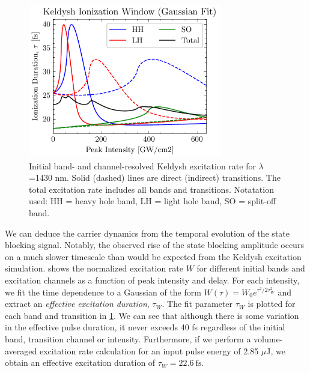 \begin{figure}
	\centering
	\includegraphics[width=0.75\textwidth]{figures/chap4/Keldysh_SingleInt_IonizationWindowFit.pdf}
	\caption{Initial band- and channel-resolved Keldysh excitation rate for $\lambda$=1430 nm. Solid (dashed) lines are direct (indirect) transitions. The total excitation rate includes all bands and transitions. Notatation used: HH = heavy hole band, LH = light hole band, SO = split-off band.}
	\label{fig:Keldysh_SingleInt_IonizationWindowFit}
\end{figure}

We can deduce the carrier dynamics from the temporal evolution of the state blocking signal. Notably, the observed rise of the state blocking amplitude occurs on a much slower timescale than would be expected from the Keldysh excitation simulation.  shows the normalized excitation rate $W$ for different initial bands and excitation channels as a function of peak intensity and delay. For each intensity, we fit the time dependence to a Gaussian of the form ${W(\tau)=W_0 e^{\tau^2/2\tau_W^2}}$ and extract an \textit{effective excitation duration}, $\tau_W$. The fit parameter $\tau_W$ is plotted for each band and transition in \cref{fig:Keldysh_SingleInt_IonizationWindowFit}. We can see that although there is some variation in the effective pulse duration, it never exceeds 40 fs regardless of the initial band, transition channel or intensity. Furthermore, if we perform a volume-averaged excitation rate calculation for an input pulse energy of 2.85 $\mu$J, we obtain an effective excitation duration of $\tau_W = 22.6 \ \textrm{fs}$.

